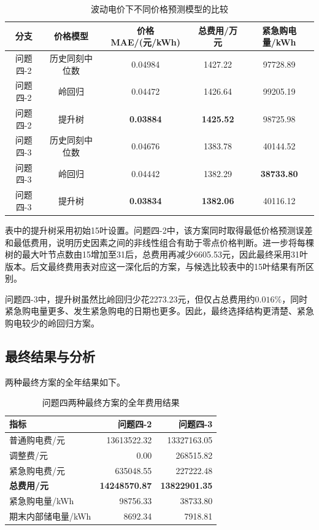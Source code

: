 \begin{table}[H]
    \centering
    \caption{波动电价下不同价格预测模型的比较}
    \small
    \begin{tabular}{ccccc}
        \hline
        分支 & 价格模型 & 价格MAE/(元/kWh) & 总费用/万元 & 紧急购电量/kWh \\
        \hline
        问题四-2 & 历史同刻中位数 & 0.04984 & 1427.22 & 97728.89 \\
        问题四-2 & 岭回归 & 0.04472 & 1426.64 & 99205.19 \\
        问题四-2 & 提升树 & \textbf{0.03884} & \textbf{1425.52} & 98725.98 \\
        \hline
        问题四-3 & 历史同刻中位数 & 0.04676 & 1383.78 & 40144.52 \\
        问题四-3 & 岭回归 & 0.04442 & 1382.29 & \textbf{38733.80} \\
        问题四-3 & 提升树 & \textbf{0.03834} & \textbf{1382.06} & 40116.12 \\
        \hline
    \end{tabular}
\end{table}

表中的提升树采用初始15叶设置。问题四-2中，该方案同时取得最低价格预测误差和最低费用，说明历史因素之间的非线性组合有助于零点价格判断。进一步将每棵树的最大叶节点数由15增加至31后，总费用再减少6605.53元，因此最终采用31叶版本。后文最终费用表对应这一深化后的方案，与候选比较表中的15叶结果有所区别。

问题四-3中，提升树虽然比岭回归少花2273.23元，但仅占总费用约$0.016\%$，同时紧急购电量更多、发生紧急购电的日期也更多。因此，最终选择结构更清楚、紧急购电较少的岭回归方案。


\subsection{最终结果与分析}

两种最终方案的全年结果如下。

\begin{table}[H]
    \centering
    \caption{问题四两种最终方案的全年费用结果}
    \begin{tabular}{lrr}
        \hline
        指标 & 问题四-2 & 问题四-3 \\
        \hline
        普通购电费/元 & 13613522.32 & 13327163.05 \\
        调整费/元 & 0.00 & 268515.82 \\
        紧急购电费/元 & 635048.55 & 227222.48 \\
        \textbf{总费用/元} & \textbf{14248570.87} & \textbf{13822901.35} \\
        紧急购电量/kWh & 98756.33 & 38733.80 \\
        期末内部储电量/kWh & 8692.34 & 7918.81 \\
        \hline
    \end{tabular}
\end{table}

